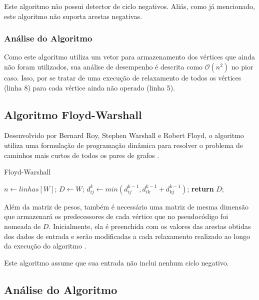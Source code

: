 \documentclass[12pt]{article}
\begin{document}
Este algoritmo não possui detector de ciclo negativos. Aliás, como já mencionado, este algoritmo não suporta arestas negativas.


\subsubsection{Análise do Algoritmo}

Como este algoritmo utiliza um vetor para armazenamento dos vértices que ainda não foram utilizados, sua análise de desempenho é descrita como $\mathcal{O}(n^2)$ no pior caso. Isso, por se tratar de uma execução de relaxamento de todos os vértices (linha 8) para cada vértice ainda não operado (linha 5).
 


\subsection{Algoritmo Floyd-Warshall}

Desenvolvido por Bernard Roy, Stephen Warshall e Robert Floyd, o algoritmo utiliza uma formulação de programação dinâmica para resolver o problema de caminhos mais curtos de todos os pares de grafos \cite{cormen2002algoritmos}.


\begin{algorithm}[H]
\caption{Floyd-Warshall}\label{alg:fw}
\begin{algorithmic}[1]
	\State $n \gets linhas[W]$;
   \State $D\gets W$;
           \State $d^k_{ij} \gets min(d^{k-1}_{ij}, d^{k-1}_{ik} + d^{k-1}_{kj})$;
       \EndFor
     \EndFor
   \EndFor
   \State \textbf{return} $D$;
\EndProcedure
\end{algorithmic}
\end{algorithm}



Além da matriz de pesos, também é necessário uma matriz de mesma dimensão que armazenará os predecessores de cada vértice que no pseudocódigo foi nomeada de $D$. Inicialmente, ela é preenchida com os valores das arestas obtidas dos dados de entrada e serão modificadas a cada relaxamento realizado ao longo da execução do algoritmo \cite{cormen2002algoritmos}.

Este algoritmo assume que sua entrada não inclui nenhum ciclo negativo.

\subsection{Análise do Algoritmo}
\end{document}

